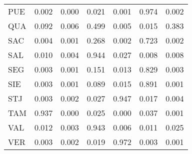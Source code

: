 \begin{table}[ht]
\begin{tabular}{lrrrrrr}
  PUE & 0.002 & 0.000 & 0.021 & 0.001 & 0.974 & 0.002 \\ 
  QUA & 0.092 & 0.006 & 0.499 & 0.005 & 0.015 & 0.383 \\ 
  SAC & 0.004 & 0.001 & 0.268 & 0.002 & 0.723 & 0.002 \\ 
  SAL & 0.010 & 0.004 & 0.944 & 0.027 & 0.008 & 0.008 \\ 
  SEG & 0.003 & 0.001 & 0.151 & 0.013 & 0.829 & 0.003 \\ 
  SIE & 0.003 & 0.001 & 0.089 & 0.015 & 0.891 & 0.001 \\ 
  STJ & 0.003 & 0.002 & 0.027 & 0.947 & 0.017 & 0.004 \\ 
  TAM & 0.937 & 0.000 & 0.025 & 0.000 & 0.037 & 0.001 \\ 
  VAL & 0.012 & 0.003 & 0.943 & 0.006 & 0.011 & 0.025 \\ 
  VER & 0.003 & 0.002 & 0.019 & 0.972 & 0.003 & 0.001 \\ 
   \hline
\end{tabular}
\end{table}

